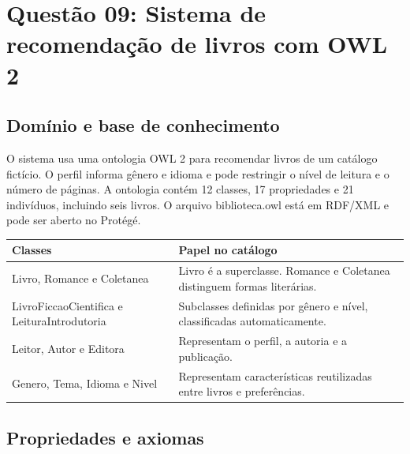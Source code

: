\documentclass[12pt,a4paper]{article}
\begin{document}
\section{Questão 09: Sistema de recomendação de livros com OWL 2}

\subsection{Domínio e base de conhecimento}

O sistema usa uma ontologia OWL 2 para recomendar livros de um catálogo fictício. O perfil informa gênero e idioma e pode restringir o nível de leitura e o número de páginas. A ontologia contém 12 classes, 17 propriedades e 21 indivíduos, incluindo seis livros. O arquivo biblioteca.owl está em RDF/XML e pode ser aberto no Protégé.

\begin{table}[htbp]
    \centering
    \begin{tabular}{>{\raggedright\arraybackslash}p{5.8cm} >{\raggedright\arraybackslash}p{9.0cm}}
        \toprule
        \textbf{Classes} & \textbf{Papel no catálogo} \\
        \midrule
        Livro, Romance e Coletanea & Livro é a superclasse. Romance e Coletanea distinguem formas literárias. \\
        \addlinespace
        LivroFiccaoCientifica e LeituraIntrodutoria & Subclasses definidas por gênero e nível, classificadas automaticamente. \\
        \addlinespace
        Leitor, Autor e Editora & Representam o perfil, a autoria e a publicação. \\
        \addlinespace
        Genero, Tema, Idioma e Nivel & Representam características reutilizadas entre livros e preferências. \\
        \bottomrule
    \end{tabular}
\end{table}

\subsection{Propriedades e axiomas}
\end{document}
